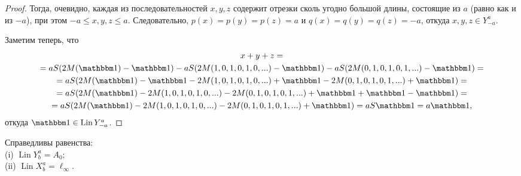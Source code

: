 \begin{proof}
	Тогда, очевидно, каждая из последовательностей $x,y,z$ содержит отрезки сколь угодно большой длины,
	состоящие из $a$ (равно как и из $-a$), при этом $-a \leq x,y,z \leq a$.
	Следовательно, $p(x)=p(y)=p(z) = a$ и $q(x)=q(y)=q(z) = -a$,
	откуда $x,y,z \in Y^a_{-a}$.

	Заметим теперь, что
	\begin{multline}
		x + y + z
		=
		\\=
		aS(2M(\one)-\one) - aS(2M(1,0,1,0,1,0,...)-\one) - aS(2M(0,1,0,1,0,1,...)-\one)
		=
		\\=
		aS(2M(\one)-\one  -    2M(1,0,1,0,1,0,...)+\one  -    2M(0,1,0,1,0,1,...)+\one)
		=
		\\=
		aS(2M(\one) - 2M(1,0,1,0,1,0,...) - 2M(0,1,0,1,0,1,...)+\one+\one-\one)
		=
		\\=
		aS(2M(\one) - 2M(1,0,1,0,1,0,...) - 2M(0,1,0,1,0,1,...)+\one)
		=
		aS\one
		=
		a\one
		,
	\end{multline}
	откуда $\one \in \operatorname{Lin} Y^a_{-a}$.
\end{proof}

\begin{theorem}
	\label{thm:A_0_c_infty_lin}
	Справедливы равенства:
	\\
	(i) $\operatorname{Lin} Y^a_b = A_0$;
	\\
	(ii) $\operatorname{Lin} X^a_b = \ell_\infty$.
\end{theorem}

